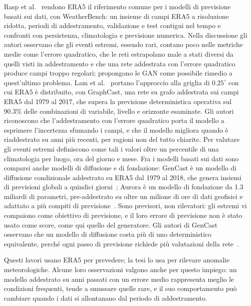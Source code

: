 Rasp et al.~\cite{rasp2020weatherbench} rendono ERA5 il riferimento comune per i modelli di previsione basati sui dati, con WeatherBench: un insieme di campi ERA5 a risoluzione ridotta, periodi di addestramento, validazione e test contigui nel tempo e confronti con persistenza, climatologia e previsione numerica. Nella discussione gli autori osservano che gli eventi estremi, essendo rari, contano poco nelle metriche medie come l'errore quadratico, che le reti estrapolano male a stati diversi da quelli visti in addestramento e che una rete addestrata con l'errore quadratico produce campi troppo regolari; propongono le GAN come possibile rimedio a quest'ultimo problema. Lam et al.~\cite{lam2023graphcast} portano l'approccio alla griglia di $0.25^\circ$ con cui ERA5 è distribuito, con GraphCast, una rete su grafo addestrata sui campi ERA5 dal 1979 al 2017, che supera la previsione deterministica operativa sul 90.3\% delle combinazioni di variabile, livello e orizzonte esaminate. Gli autori riconoscono che l'addestramento con l'errore quadratico porta il modello a esprimere l'incertezza sfumando i campi, e che il modello migliora quando è riaddestrato su anni più recenti, per ragioni non del tutto chiarite. Per valutare gli eventi estremi definiscono come tali i valori oltre un percentile di una climatologia per luogo, ora del giorno e mese. Fra i modelli basati sui dati sono comparsi anche modelli di diffusione e di fondazione: GenCast è un modello di diffusione condizionale addestrato su ERA5 dal 1979 al 2018, che genera insiemi di previsioni globali a quindici giorni~\cite{price2025gencast}; Aurora è un modello di fondazione da 1.3 miliardi di parametri, pre-addestrato su oltre un milione di ore di dati geofisici e adattato a più compiti di previsione~\cite{bodnar2025aurora}. Sono previsori, non rilevatori: gli estremi vi compaiono come obiettivo di previsione, e il loro errore di previsione non è stato usato come score, come qui quello del generatore. Gli autori di GenCast osservano che un modello di diffusione costa più di uno deterministico equivalente, perché ogni passo di previsione richiede più valutazioni della rete~\cite{price2025gencast}.

Questi lavori usano ERA5 per prevedere; la tesi lo usa per rilevare anomalie meteorologiche. Alcune loro osservazioni valgono anche per questo impiego: un modello addestrato su anni passati con un errore medio rappresenta meglio le condizioni frequenti, tende a smussare quelle rare, e il suo comportamento può cambiare quando i dati si allontanano dal periodo di addestramento.


